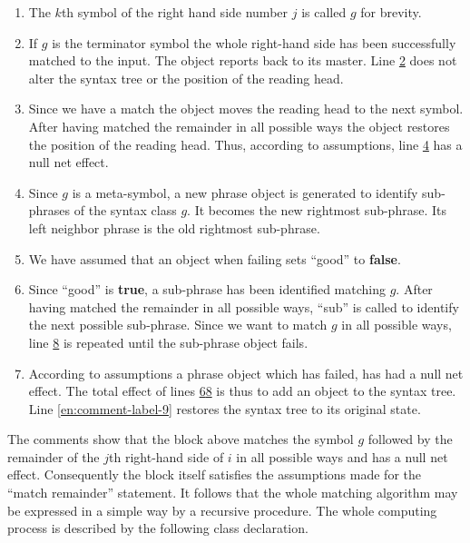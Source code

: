 \documentclass[twoside,11pt]{book}
\begin{document}
\begin{enumerate}[leftmargin=*, itemindent=2.2\parindent, nosep, label=Line \arabic*.]
	\item The $k$th symbol of the right hand side number $j$ is called $g$ for brevity.
	\item If $g$ is the terminator symbol the whole right-hand side has been successfully matched to the input. The object reports back to its master. Line \hyperref[en:comment-label-2]{2} does not alter the syntax tree or the position of the reading head.

	\setcounter{enumi}{3}
	\item Since we have a match the object moves the reading head to the next symbol. After having matched the remainder in all possible ways the
	object restores the position of the reading head. Thus, according to assumptions, line \hyperref[en:comment-label-4]{4} has a null net effect. 
	
	\setcounter{enumi}{5}
	\item Since $g$ is a meta-symbol, a new phrase object is generated to identify sub-phrases of the syntax class $g$. It becomes the new rightmost sub-phrase. Its left neighbor phrase is the old rightmost sub-phrase.
	
	\item We have assumed that an object when failing sets ``good'' to \textbf{false}.
	
	\item Since ``good'' is \textbf{true}, a sub-phrase has been identified matching $g$. After having matched the remainder in all possible ways, ``sub'' is 	called to identify the next possible sub-phrase. Since we want to match $g$ in all possible ways, line \hyperref[en:comment-label-8]{8} is repeated until the sub-phrase object fails.
	
	\item According to assumptions a phrase object which has failed, has had a null net effect. The total effect of lines \hyperref[en:comment-label-6]{6}\textendash\hyperref[en:comment-label-8]{8} is thus to add an object to the syntax tree. Line \ref{en:comment-label-9} restores the syntax tree to its original state.
\end{enumerate}

The comments show that the block above matches the symbol $g$ followed by the remainder of the $j$th right-hand side of $i$ in all possible ways and has a null net effect. Consequently the block itself satisfies the assumptions made for the ``match remainder'' statement. It follows that the whole matching algorithm may be expressed in a simple way by a recursive procedure. The whole computing process is described by the following class declaration.
\end{document}
